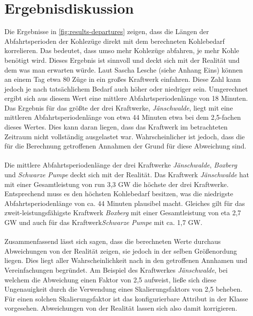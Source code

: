\section{Ergebnisdiskussion}

Die Ergebnisse in \autoref{fig:results-departures} zeigen, dass die Längen der Abfahrtsperioden der Kohlezüge direkt mit dem berechneten Kohlebedarf korrelieren. Das bedeutet, dass umso mehr Kohlezüge abfahren, je mehr Kohle benötigt wird. Dieses Ergebnis ist sinnvoll und deckt sich mit der Realität und dem was man erwarten würde. Laut Sascha Lesche (siehe Anhang Eins) können an einem Tag etwa 80 Züge in ein großes Kraftwerk einfahren. Diese Zahl kann jedoch je nach tatsächlichem Bedarf auch höher oder niedriger sein. Umgerechnet ergibt sich aus diesem Wert eine mittlere Abfahrtsperiodenlänge von 18 Minuten. Das Ergebnis für das größte der drei Kraftwerke, \emph{Jänschwalde}, liegt mit eine mittleren Abfahrtsperiodenlänge von etwa 44 Minuten etwa bei dem 2,5-fachen dieses Wertes. Dies kann daran liegen, dass das Kraftwerk im betrachteten Zeitraum nicht vollständig ausgelastet war. Wahrscheinlicher ist jedoch, dass die für die Berechnung getroffenen Annahmen der Grund für diese Abweichung sind.\\
\\
Die mittlere Abfahrtsperiodenlänge der drei Kraftwerke \emph{Jänschwalde}, \emph{Boxberg} und \emph{Schwarze Pumpe} deckt sich mit der Realität. Das Kraftwerk \emph{Jänschwalde} hat mit einer Gesamtleistung von run 3,3 GW die höchste der drei Kraftwerke. Entsprechend muss es den höchsten Kohlebedarf besitzen, was die niedrigste Abfahrtsperiodenlänge von ca. 44 Minuten plausibel macht. Gleiches gilt für das zweit-leistungsfähigste Kraftwerk \emph{Boxberg} mit einer Gesamtleistung von eta 2,7 GW und auch für das Kraftwerk\emph{Schwarze Pumpe} mit ca. 1,7 GW. \cite{noauthor_bundesnetzagentur_nodate}\\
\\
Zusammenfassend lässt sich sagen, dass die berechneten Werte durchaus Abweichungen von der Realität zeigen, sie jedoch in der selben Größenordung liegen. Dies liegt aller Wahrscheinlichkeit nach in den getroffenen Annhamen und Vereinfachungen begründet. Am Beispiel des Kraftwerkes \emph{Jänschwalde}, bei welchem die Abweichung einen Faktor von 2,5 aufweist, ließe sich diese Ungenauigkeit durch die Verwendung eines Skalierungsfaktors von 2,5 beheben. Für einen solchen Skalierungsfaktor ist das konfigurierbare Attribut  in der Klasse  vorgesehen. Abweichungen von der Realität lassen sich also damit korrigieren.